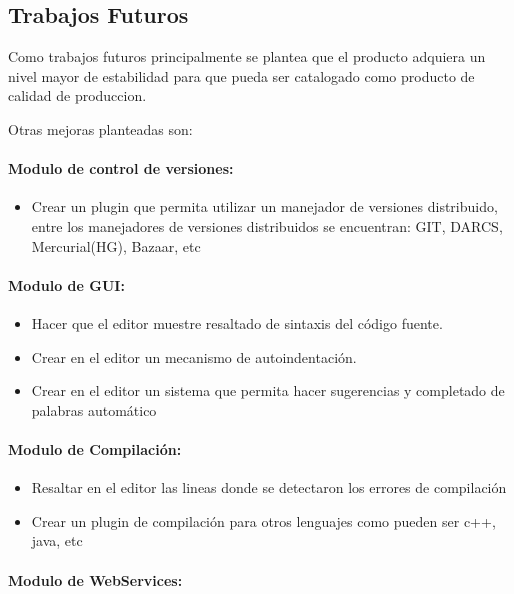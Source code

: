 \subsection{Trabajos Futuros}

Como trabajos futuros principalmente se plantea que el producto adquiera un nivel mayor de estabilidad para que pueda ser catalogado como producto de calidad de produccion.

Otras mejoras planteadas son:

\paragraph{Modulo de control de versiones:}

\begin{itemize}
	\item Crear un plugin que permita utilizar un manejador de versiones distribuido, entre los manejadores de versiones distribuidos se encuentran: GIT, DARCS, Mercurial(HG), Bazaar, etc
\end{itemize}

\paragraph{Modulo de GUI:}

\begin{itemize}
	\item Hacer que el editor muestre resaltado de sintaxis del código fuente.
	\item Crear en el editor un mecanismo de autoindentación.
	\item Crear en el editor un sistema que permita hacer sugerencias y completado de palabras automático
\end{itemize}

\paragraph{Modulo de Compilación:}

\begin{itemize}
	\item Resaltar en el editor las lineas donde se detectaron los errores de compilación
	\item Crear un plugin de compilación para otros lenguajes como pueden ser c++, java, etc
\end{itemize}

\paragraph{Modulo de WebServices:}


